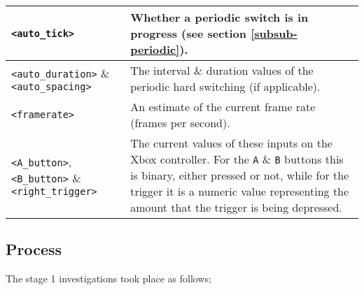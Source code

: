 \begin{center}
\begin{longtable}{| l | p{8cm} |}
\hline

\texttt{<auto\_tick>} & Whether a periodic switch is in progress (see section \ref{subsub-periodic}). \\

\hline

\texttt{<auto\_duration>} \& \texttt{<auto\_spacing>} & The interval \& duration values of the periodic hard switching (if applicable). \\

\hline

\texttt{<framerate>} & An estimate of the current frame rate (frames per second). \\

\hline

\texttt{<A\_button>}, \texttt{<B\_button>} \& \texttt{<right\_trigger>} & The current values of these inputs on the Xbox controller. For the \texttt{A} \& \texttt{B} buttons this is binary, either pressed or not, while for the trigger it is a numeric value representing the amount that the trigger is being depressed. \\

\hline

\end{longtable}
\end{center}


\subsection{Process}

The stage 1 investigations took place as follows;

